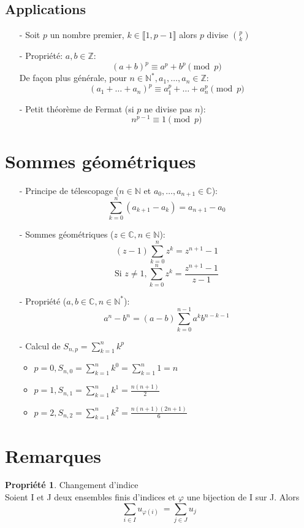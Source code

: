 \documentclass[fleqn]{article}
\theoremstyle{definition} \newtheorem*{defi}{D\'efinition}
\theoremstyle{definition} \newtheorem*{theo}{Th\'eor\`eme}
\theoremstyle{definition} \newtheorem*{prop}{Propri\'et\'e}
\begin{document}
\subsection{Applications}
\begin{itemize}
	\item [-] Soit \(p\) un nombre premier, \(k \in \llbracket 1,p-1 \rrbracket \) alors \(p\) divise \(\binom{p}{k}\)
	\item [-] Propri\'{e}t\'{e}: \(a,b \in \mathbb{Z}\):
		\[(a+b)^p \equiv a^p + b^p \pmod{p}\]
		De fa\c{c}on plus g\'en\'erale, pour \(n \in \mathbb{N}^*, a_1, \hdots, a_n \in \mathbb{Z}\):
		\[(a_1+\hdots+a_n)^p \equiv a_1^p+\hdots+a_n^p \pmod{p}\]
	\item [-] Petit th\'eor\`eme de Fermat (si \(p\) ne divise pas \(n\)):
		\[n^{p-1} \equiv 1\pmod{p} \]
\end{itemize}

\section{Sommes g\'eom\'etriques}
\begin{itemize}
	\item [-] Principe de t\'elescopage (\(n \in \mathbb{N}\) et \(a_0, \hdots, a_{n+1} \in \mathbb{C}\)):
		\[\sum_{k=0}^{n} (a_{k+1} - a_k) = a_{n+1} - a_0\]
	\item [-] Sommes g\'eom\'etriques (\(z \in \mathbb{C}, n \in \mathbb{N}\)):
		\[(z-1)\sum_{k=0}^{n}z^k = z^{n+1} -1\]
		\[\text{Si } z \neq 1, \sum_{k=0}^{n}z^k=\frac{z^{n+1}-1}{z-1}\]
	\item [-] Propri\'{e}t\'{e} (\(a,b \in \mathbb{C}, n \in \mathbb{N}^*\)):
		\[a^n-b^n = (a-b)\sum_{k=0}^{n-1}a^kb^{n-k-1}\]
	\item [-] Calcul de \(S_{n,p} = \sum_{k=1}^{n}k^p\)
		\begin{itemize}
			\item \(p = 0, S_{n,0} = \sum_{k=1}^{n}k^0 = \sum_{k=1}^{n}1 = n\)
			\item \(p = 1, S_{n,1} = \sum_{k=1}^{n}k^1 = \frac{n(n+1)}{2} \)
			\item \(p = 2, S_{n,2} = \sum_{k=1}^{n}k^2 = \frac{n(n+1)(2n+1)}{6} \)
		\end{itemize}
\end{itemize}

\section{Remarques}
\begin{prop} Changement d'indice\\
	Soient I et J deux ensembles finis d'indices et $\varphi$ une bijection de I sur J. Alors
	\[\underset{i \in I}{\sum} u_{\varphi(i)}\ = \underset{j \in J}{\sum} u_j\]
\end{prop}
\end{document}
